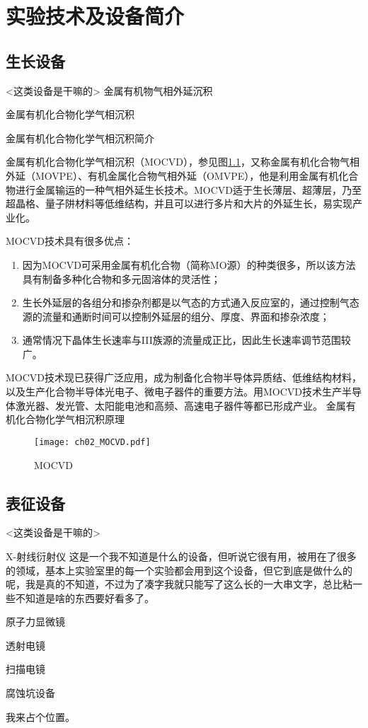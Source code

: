 % 

\chapter{实验技术及设备简介}
\section{生长设备}
<这类设备是干嘛的>
金属有机物气相外延沉积 

{\hei 金属有机化合物化学气相沉积}

金属有机化合物化学气相沉积简介

金属有机化合物化学气相沉积（MOCVD），参见图\ref{fig:mocvd}，又称金属有机化合物气相外延（MOVPE）、有机金属化合物气相外延（OMVPE），他是利用金属有机化合物进行金属输运的一种气相外延生长技术。MOCVD适于生长薄层、超薄层，乃至超晶格、量子阱材料等低维结构，并且可以进行多片和大片的外延生长，易实现产业化。

MOCVD技术具有很多优点：
\begin{enumerate}[(1)]
\item 因为MOCVD可采用金属有机化合物（简称MO源）的种类很多，所以该方法具有制备多种化合物和多元固溶体的灵活性；
\item 生长外延层的各组分和掺杂剂都是以气态的方式通入反应室的，通过控制气态源的流量和通断时间可以控制外延层的组分、厚度、界面和掺杂浓度；
\item 通常情况下晶体生长速率与III族源的流量成正比，因此生长速率调节范围较广。
\end{enumerate}

MOCVD技术现已获得广泛应用，成为制备化合物半导体异质结、低维结构材料，以及生产化合物半导体光电子、微电子器件的重要方法。用MOCVD技术生产半导体激光器、发光管、太阳能电池和高频、高速电子器件等都已形成产业。
金属有机化合物化学气相沉积原理

\begin{figure}[h]
	\centering
	\texttt{[image: ch02\_MOCVD.pdf]}
	\caption{MOCVD}
	\label{fig:mocvd}
\end{figure}

\section{表征设备}

<这类设备是干嘛的>

{\hei X-射线衍射仪} 这是一个我不知道是什么的设备，但听说它很有用，被用在了很多的领域，基本上实验室里的每一个实验都会用到这个设备，但它到底是做什么的呢，我是真的不知道，不过为了凑字我就只能写了这么长的一大串文字，总比粘一些不知道是啥的东西要好看多了。

{\hei 原子力显微镜}

{\hei 透射电镜}

{\hei 扫描电镜}

{\hei 腐蚀坑设备}

我来占个位置。\cite{BUPT_Thesis_Format_2004}

\ifx\usechapbib\empty


\fi



